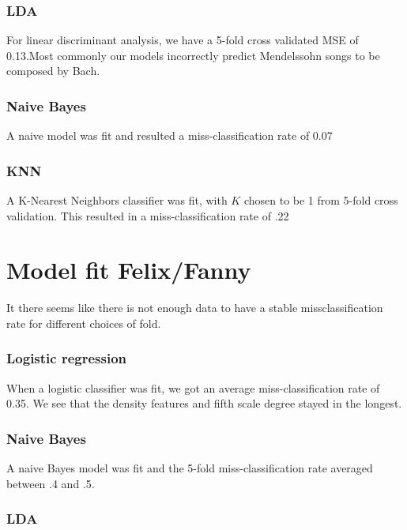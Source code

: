 \documentclass[12pt,twoside]{reedthesis}
\theoremstyle{definition}
\theoremstyle{definition}
\theoremstyle{definition}
\theoremstyle{remark}
\begin{document}
\subsubsection{LDA}\label{lda}

For linear discriminant analysis, we have a 5-fold cross validated MSE
of 0.13.Most commonly our models incorrectly predict Mendelssohn songs
to be composed by Bach.

\subsubsection{Naive Bayes}\label{naive-bayes-1}

A naive model was fit and resulted a miss-classification rate of 0.07

\subsubsection{KNN}\label{knn}

A K-Nearest Neighbors classifier was fit, with \(K\) chosen to be 1 from
5-fold cross validation. This resulted in a miss-classification rate of
.22

\section{Model fit Felix/Fanny}\label{model-fit-felixfanny}

It there seems like there is not enough data to have a stable
missclassification rate for different choices of fold.

\subsubsection{Logistic regression}\label{logistic-regression-2}

When a logistic classifier was fit, we got an average
miss-classification rate of 0.35. We see that the density features and
fifth scale degree stayed in the longest.

\subsubsection{Naive Bayes}\label{naive-bayes-2}

A naive Bayes model was fit and the 5-fold miss-classification rate
averaged between .4 and .5.

\subsubsection{LDA}\label{lda-1}
\end{document}
